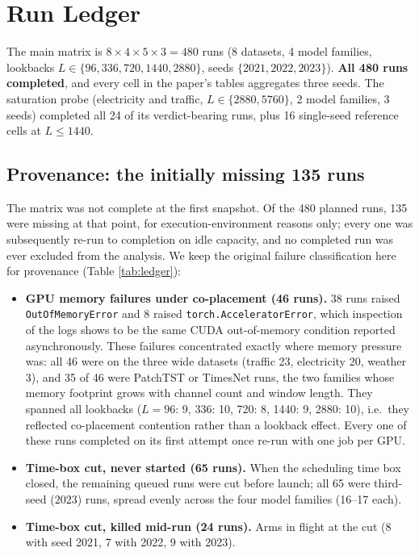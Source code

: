 \section{Run Ledger}
\label{app:ledger}

The main matrix is $8 \times 4 \times 5 \times 3 = 480$ runs (8 datasets, 4 model families, lookbacks $L \in \{96, 336, 720, 1440, 2880\}$, seeds $\{2021, 2022, 2023\}$). \textbf{All 480 runs completed}, and every cell in the paper's tables aggregates three seeds. The saturation probe (electricity and traffic, $L \in \{2880, 5760\}$, 2 model families, 3 seeds) completed all 24 of its verdict-bearing runs, plus 16 single-seed reference cells at $L \le 1440$.

\subsection{Provenance: the initially missing 135 runs}

The matrix was not complete at the first snapshot. Of the 480 planned runs, 135 were missing at that point, for execution-environment reasons only; every one was subsequently re-run to completion on idle capacity, and no completed run was ever excluded from the analysis. We keep the original failure classification here for provenance (Table \ref{tab:ledger}):

\begin{itemize}
\item \textbf{GPU memory failures under co-placement (46 runs).} 38 runs raised \texttt{OutOfMemoryError} and 8 raised \texttt{torch.AcceleratorError}, which inspection of the logs shows to be the same CUDA out-of-memory condition reported asynchronously. These failures concentrated exactly where memory pressure was: all 46 were on the three wide datasets (traffic 23, electricity 20, weather 3), and 35 of 46 were PatchTST or TimesNet runs, the two families whose memory footprint grows with channel count and window length. They spanned all lookbacks ($L{=}96$: 9, 336: 10, 720: 8, 1440: 9, 2880: 10), i.e.\ they reflected co-placement contention rather than a lookback effect. Every one of these runs completed on its first attempt once re-run with one job per GPU.
\item \textbf{Time-box cut, never started (65 runs).} When the scheduling time box closed, the remaining queued runs were cut before launch; all 65 were third-seed ($2023$) runs, spread evenly across the four model families (16--17 each).
\item \textbf{Time-box cut, killed mid-run (24 runs).} Arms in flight at the cut (8 with seed 2021, 7 with 2022, 9 with 2023).
\end{itemize}

